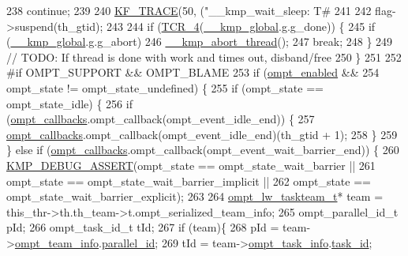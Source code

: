 \begin{DoxyCode}
{{238             \textcolor{keywordflow}{continue};
239 
240         \hyperlink{kmp__debug_8h_aa77d06a01f304e7b70fe1f4b052a1b57}{KF\_TRACE}(50, (\textcolor{stringliteral}{"\_\_kmp\_wait\_sleep: T#%
241 
242         flag->suspend(th\_gtid);
243 
244         \textcolor{keywordflow}{if} (\hyperlink{kmp__os_8h_acd6256e4afba32d90997235fc0a38a74}{TCR\_4}(\hyperlink{kmp_8h_a11b71922a4df46ff9e8dbc68693e8d67}{\_\_kmp\_global}.g.g\_done)) \{
245             \textcolor{keywordflow}{if} (\hyperlink{kmp_8h_a11b71922a4df46ff9e8dbc68693e8d67}{\_\_kmp\_global}.g.g\_abort)
246                 \hyperlink{kmp_8h_a3af0772074c6291cf8d346cef0e22c75}{\_\_kmp\_abort\_thread}();
247             \textcolor{keywordflow}{break};
248         \}
249         \textcolor{comment}{// TODO: If thread is done with work and times out, disband/free}
250     \}
251 
252 \textcolor{preprocessor}{#if OMPT\_SUPPORT && OMPT\_BLAME}
253 \textcolor{preprocessor}{}    \textcolor{keywordflow}{if} (\hyperlink{ompt-general_8c_a966b31b6d05f79f5495f8d8e71732f68}{ompt\_enabled} &&
254         ompt\_state != ompt\_state\_undefined) \{
255         \textcolor{keywordflow}{if} (ompt\_state == ompt\_state\_idle) \{
256             \textcolor{keywordflow}{if} (\hyperlink{ompt-general_8c_a84a29d89cef82c7c38e1ee1f70ec994f}{ompt\_callbacks}.ompt\_callback(ompt\_event\_idle\_end)) \{
257                 \hyperlink{ompt-general_8c_a84a29d89cef82c7c38e1ee1f70ec994f}{ompt\_callbacks}.ompt\_callback(ompt\_event\_idle\_end)(th\_gtid + 1);
258             \}
259         \} \textcolor{keywordflow}{else} \textcolor{keywordflow}{if} (\hyperlink{ompt-general_8c_a84a29d89cef82c7c38e1ee1f70ec994f}{ompt\_callbacks}.ompt\_callback(ompt\_event\_wait\_barrier\_end)) \{
260             \hyperlink{kmp__debug_8h_ad766efc30e33e28634691088e80cdf08}{KMP\_DEBUG\_ASSERT}(ompt\_state == ompt\_state\_wait\_barrier ||
261                              ompt\_state == ompt\_state\_wait\_barrier\_implicit ||
262                              ompt\_state == ompt\_state\_wait\_barrier\_explicit);
263 
264             \hyperlink{structompt__lw__taskteam__s}{ompt\_lw\_taskteam\_t}* team = this\_thr->th.th\_team->t.ompt\_serialized\_team\_info;
265             ompt\_parallel\_id\_t pId;
266             ompt\_task\_id\_t tId;
267             \textcolor{keywordflow}{if} (team)\{
268                 pId = team->\hyperlink{structompt__lw__taskteam__s_a548ab004e1bed7cea20532f1e168ce3d}{ompt\_team\_info}.\hyperlink{structompt__team__info__t_aea8969d8ca37577c35b466c675a7a241}{parallel\_id};
269                 tId = team->\hyperlink{structompt__lw__taskteam__s_aef7e0a0307d5b34644ddaa0cc7e9ba46}{ompt\_task\_info}.\hyperlink{structompt__task__info__t_a9b45ec47bd1086973892108a3a71e6fe}{task\_id};
}}}
\end{DoxyCode}
